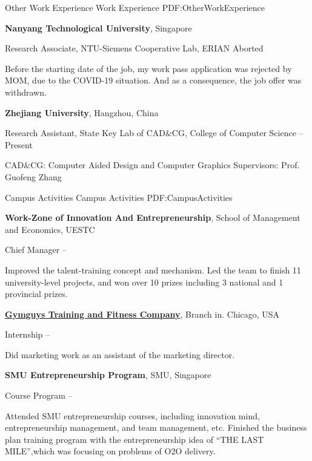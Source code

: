 \documentclass[letterpaper,MMMyyyy,nonstopmode]{simpleresumecv}
\begin{document}
\begin{Body}
\Section
{Other Work\newline
	Experience}
{Work Experience}
{PDF:OtherWorkExperience}


{\textbf{Nanyang Technological University}},
Singapore

\Gap
\BulletItem
Research Associate,
NTU-Siemens Cooperative Lab, ERIAN
\hfill
Aborted
\begin{Detail}
	\SubBulletItem
	Before the starting date of the job, my work pass application was rejected by MOM, due to the COVID-19 situation. And as a consequence, the job offer was withdrawn.
\end{Detail}


\Entry
{\textbf{Zhejiang University}},
Hangzhou, China

\Gap
\BulletItem
Research Assistant,
State Key Lab of CAD\&CG,
College of Computer Science
\hfill
{} --
Present
\begin{Detail}
	\SubBulletItem
	CAD\&CG: Computer Aided Design and Computer Graphics
	\SubBulletItem
	Supervisors:
	Prof. Guofeng Zhang
\end{Detail}

\Section
{Campus Activities}
{Campus Activities}
{PDF:CampusActivities}

\Entry
{\textbf{Work-Zone of Innovation And Entrepreneurship}},
School of Management and Economics, 
UESTC

\Gap
\BulletItem
Chief Manager
\hfill
{} --
\begin{Detail}
\SubBulletItem
Improved the talent-training concept and mechanism.
\SubBulletItem
Led the team to finish 11 university-level projects, and won over 10 prizes including 3 national
 and 1 provincial prizes.
\end{Detail}

\href{http://www.example.com/my-club}
{\textbf{Gymguys Training and Fitness Company}},
Branch in. 
Chicago, 
USA

\Gap
\BulletItem
Internship
\hfill
{} --
\begin{Detail}
	\SubBulletItem
	Did marketing work as an assistant of the marketing director.
\end{Detail}

{\textbf{SMU Entrepreneurship Program}},
SMU,
Singapore

\Gap
\BulletItem
Course Program
\hfill
{} --
\begin{Detail}
\SubBulletItem
Attended SMU entrepreneurship courses, including innovation mind, entrepreneurship management, and team management, etc.
\SubBulletItem
Finished the business plan training program with the entrepreneurship idea of “THE LAST MILE”,which was focusing on problems of O2O delivery.
\end{Detail}




\end{Body}
\end{document}
